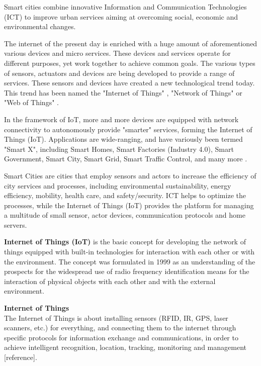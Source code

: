 Smart cities combine innovative Information and Communication Technologies (ICT) to improve urban services aiming at overcoming social, economic and environmental changes. 

The internet of the present day is enriched with a huge amount of aforementioned various devices and micro services. These devices and services operate for different purposes, yet work together to achieve common goals. The various types of sensors, actuators and devices are being developed to provide a range of services. These sensors and devices have created a new technological trend today. This trend has been named the "Internet of Things" \cite{WeberRomana2010}, "Network of Things" \cite{Gubbi+2013} or "Web of Things" \cite{Guinard+2010}. 

In the framework of IoT, more and more devices are equipped with network connectivity to autonomously provide "smarter" services, forming the Internet of Things (IoT). Applications are wide-ranging, and have variously been termed "Smart X", including Smart Homes, Smart Factories (Industry 4.0), Smart Government, Smart City, Smart Grid, Smart Traffic Control, and many more \cite{Kuryazov+2018}.

Smart Cities are cities that employ sensors and actors to increase the efficiency of city services and processes, including environmental sustainability, energy efficiency, mobility, health care, and safety/security. ICT helps to optimize the processes, while the Internet of Things (IoT) provides the platform for managing a multitude of small sensor, actor devices, communication protocols and home servers.

\textbf{Internet of Things (IoT)} \cite{WeberRomana2010} is the basic concept for developing the network of things equipped with built-in technologies for interaction with each other or with the environment. The concept was formulated in 1999 as an understanding of the prospects for the widespread use of radio frequency identification means for the interaction of physical objects with each other and with the external environment. 
\begin{definition}
\textbf{Internet of Things}\label{definition:internetOfThings}\\
The Internet of Things is about installing sensors (RFID, IR, GPS, laser scanners, etc.) for everything, and connecting them to the internet through specific protocols for information exchange and communications, in order to achieve intelligent recognition, location, tracking, monitoring and management [reference].
\end{definition}

